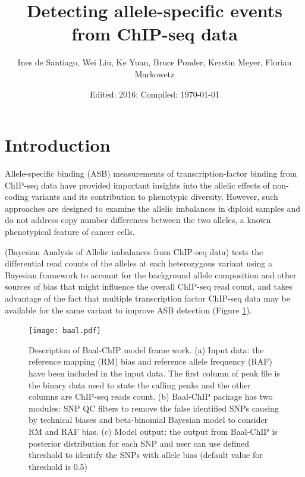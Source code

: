 \documentclass{article}\usepackage[]{graphicx}\usepackage[usenames,dvipsnames]{color}
\begin{document}
\title{Detecting allele-specific events from ChIP-seq data}
\author{Ines de Santiago, Wei Liu, Ke Yuan, Bruce Ponder, Kerstin Meyer, Florian Markowetz}

\date{Edited: 2016; Compiled: \today}

\maketitle

\tableofcontents

\section{Introduction}

Allele-specific binding (ASB) measurements of transcription-factor binding from ChIP-seq data have provided important insights into the allelic effects of non-coding variants and its contribution to phenotypic diversity. However, such approaches are designed to examine the allelic imbalances in diploid samples and do not address copy number differences between the two alleles, a known phenotypical feature of cancer cells.

 (Bayesian Analysis of Allelic imbalances from ChIP-seq data) tests the differential read counts of the alleles at each heterozygous variant using a Bayesian framework to account for the background allele composition and other sources of bias that might influence the overall ChIP-seq read count, and takes advantage of the fact that multiple transcription factor ChIP-seq data may be available for the same variant to improve ASB detection (Figure \ref{fig:baalFramewor}).

\begin{center}
\begin{figure}[H]
\texttt{[image: baal.pdf]}
\caption{Description of Baal-ChIP model frame work. (a) Input data: the reference mapping (RM) bias and reference allele frequency (RAF) have been included in the input data. The first column of peak file is the binary data used to state the calling peaks and the other columns are ChIP-seq reads count. (b) Baal-ChIP package has two modules: SNP QC filters to remove the false identified SNPs causing by technical biases and beta-binomial Bayesian model to consider RM and RAF bias. (c) Model output: the output from Baal-ChIP is posterior distribution for each SNP and user can use defined threshold to identify the SNPs with allele bias (default value for threshold is 0.5)}
\label{fig:baalFramewor}
\end{figure}
\end{center}
\end{document}
